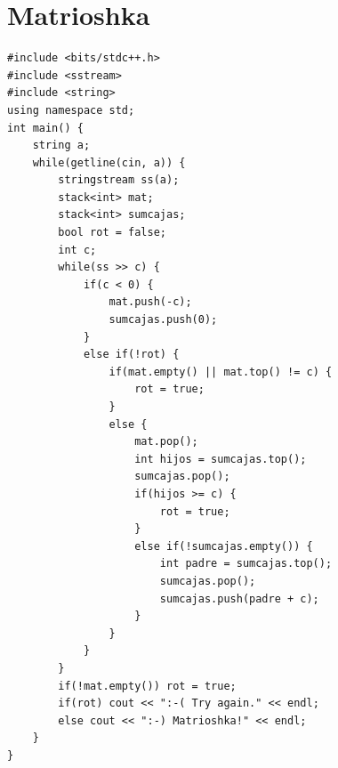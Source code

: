 \documentclass[10pt,twocolumn,letterpaper]{report}
\begin{document}
\section{Matrioshka}
\begin{lstlisting}
#include <bits/stdc++.h>
#include <sstream>
#include <string>
using namespace std;
int main() {
    string a;
    while(getline(cin, a)) {
        stringstream ss(a);
        stack<int> mat;
        stack<int> sumcajas;
        bool rot = false;
        int c;
        while(ss >> c) {
            if(c < 0) {
                mat.push(-c);
                sumcajas.push(0);
            }
            else if(!rot) {
                if(mat.empty() || mat.top() != c) {
                    rot = true;
                }
                else {
                    mat.pop();
                    int hijos = sumcajas.top();
                    sumcajas.pop();
                    if(hijos >= c) {
                        rot = true;
                    }
                    else if(!sumcajas.empty()) {
                        int padre = sumcajas.top();
                        sumcajas.pop();
                        sumcajas.push(padre + c);
                    }
                }
            }
        }
        if(!mat.empty()) rot = true;
        if(rot) cout << ":-( Try again." << endl;
        else cout << ":-) Matrioshka!" << endl;
    }
}
\end{lstlisting}
\end{document}
